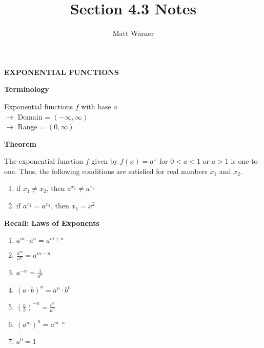 \documentclass{report}
\title{\Huge{Section 4.3 Notes}}
\author{\huge{Matt Warner}}
\date{\huge{}}
\begin{document}
	\maketitle	
\begin{large}
\begin{center}
	\textbf{EXPONENTIAL FUNCTIONS}  
\end{center}
\textbf{Terminology}


\begin{center}
Exponential functions $f$ with base $a$ \\
\noindent $\rightarrow$ Domain = $(-\infty, \infty)$ \\
$\rightarrow$ Range = $(0, \infty)$
\end{center}
\bigbreak \noindent \bigbreak \noindent
{}
\end{large}
\bigbreak \noindent \bigbreak \noindent
\begin{large}

	\noindent \textbf{Theorem}
\bigbreak
\begin{mdframed}
	\noindent The exponential function $f$ given by $f(x) = a^x$ for $ 0 < a < 1$ or $ a > 1$ is one-to-one. Thus, the following conditions are satisfied for real numbers $x_1$ and $x_2$.
	\begin{enumerate}
		\item if $x_1 \neq x_2$, then $a^{x_1} \neq a^{x_2}$ 
		\item if $a^{x_1} = a^{x_2}$, then $x_1 = x^2$
	\end{enumerate}
\end{mdframed}
\end{large}
\bigbreak \noindent \bigbreak \noindent \bigbreak \noindent \bigbreak \noindent
\begin{large}
	\textbf{Recall: Laws of Exponents} 

\begin{enumerate}
	\item $a^m \cdot a^n=a^{m+n}$ 
	\item $\frac{a^m}{a^n}=a^{m-n}$
	\item $a^{-n}=\frac{1}{a^n}$
	\item $(a \cdot b)^n=a^n \cdot b^n$
	\item $\left(\frac{a}{b}\right)^{-n}=\frac{b^n}{a^n}$
	\item $\left(a^m\right)^n=a^{m \cdot n}$
	\item $a^0=1$
\end{enumerate}
\end{large}
\end{document}
